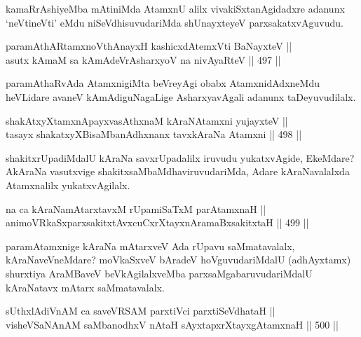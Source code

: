 \begin{artha}
kamaRrAshiyeMba mAtiniMda AtamxnU alilx vivakiSxtanAgidadxre adanunx
`neVtineVti' eMdu niSeVdhisuvudariMda shUnayxteyeV parxsakatxvAguvudu.
\end{artha}


\begin{shl}
paramAthARtamxnoV\s thAnayxH kashicxdAtemxVti BaNayxteV || \\
asutx kAmaM sa kAmAdeVrAsharxyoV na nivAyaRteV \hfill || 497 ||  
\end{shl}

\begin{artha}
paramAthaRvAda AtamxnigiMta beVreyAgi obabx AtamxnidAdxneMdu heVLidare
avaneV kAmAdiguNagaLige AsharxyavAgali adanunx taDeyuvudilalx.
\end{artha}

\begin{shl}
shakAtxyXtamxnA\s payxvasAthxnaM kAraNAtamxni yujayxteV || \\
tasayx shakatxyXBisaMbanAdhxnanx tavxkAraNa Atamxni \hfill || 498 ||  
\end{shl}

\begin{artha}
shakitxrUpadiMdalU kAraNa savxrUpadalilx iruvudu yukatxvAgide,
EkeMdare? AkAraNa vasutxvige shakitxsaMbaMdhaviruvudariMda, Adare
kAraNavalalxda Atamxnalilx yukatxvAgilalx.
\end{artha}

\begin{shl}
na ca kAraNamAtarxtavxM rUpamiSaTxM parAtamxnaH || \\
animoVRkaSxparxsakitxtAvxcuCxrXtayxnAramaBxsakitxtaH \hfill || 499 ||  
\end{shl}

\begin{artha}
paramAtamxnige kAraNa mAtarxveV Ada rUpavu saMmatavalalx,
kAraNaveVneMdare? moVkaSxveV bAradeV hoVguvudariMdalU (adhAyxtamx)
shurxtiya AraMBaveV beVkAgilalxveMba parxsaMgabaruvudariMdalU
kAraNatavx mAtarx saMmatavalalx.
\end{artha}


\begin{shl}
sUthxlAdiVnAM ca saveVRSAM parxtiVci parxtiSeVdhataH || \\
visheVSaNAnAM saMbanodhxV nAtaH sAyxtapxrXtayxgAtamxnaH \hfill || 500 ||  
\end{shl}


